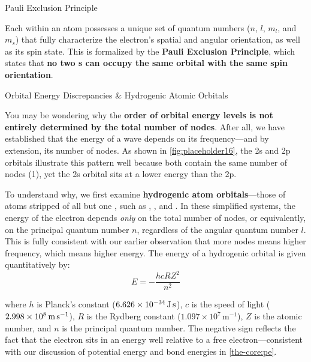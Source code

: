 \documentclass[10pt]{article}
\begin{document}
    \begin{core}{Pauli Exclusion Principle}
    
      Each  within an atom possesses a unique set of quantum numbers ($n$, $l$, $m_l$, and $m_s$) that fully characterize the electron's spatial and angular orientation, as well as its spin state. This is formalized by the \textbf{Pauli Exclusion Principle}, which states that \textbf{no two s can occupy the same orbital with the same spin orientation}.

    \end{core}

    \begin{core}[label=core:hydrogenic]{Orbital Energy Discrepancies \& Hydrogenic Atomic Orbitals}

      You may be wondering why the \textbf{order of orbital energy levels is not entirely determined by the total number of nodes}. After all, we have established that the energy of a wave depends on its frequency---and by extension, its number of nodes. As shown in \autoref{fig:placeholder16}, the 2s and 2p orbitals illustrate this pattern well because both contain the same number of nodes (1), yet the 2s orbital sits at a lower energy than the 2p.


      To understand why, we first examine \textbf{hydrogenic atom orbitals}---those of atoms stripped of all but one , such as , , and . In these simplified systems, the energy of the electron depends \textit{only} on the total number of nodes, or equivalently, on the principal quantum number $n$, regardless of the angular quantum number $l$. This is fully consistent with our earlier observation that more nodes means higher frequency, which means higher energy. The energy of a hydrogenic orbital is given quantitatively by:
      \[
        E = -\frac{hcRZ^2}{n^2}
      \]

      where $h$ is Planck's constant ($6.626 \times 10^{-34}\,\text{J\,s}$), $c$ is the speed of light ($2.998 \times 10^8\,\text{m\,s}^{-1}$), $R$ is the Rydberg constant ($1.097 \times 10^7\,\text{m}^{-1}$), $Z$ is the atomic number, and $n$ is the principal quantum number. The negative sign reflects the fact that the electron sits in an energy well relative to a free electron---consistent with our discussion of potential energy and bond energies in \autoref{the-core:pe}.


\end{core}
\end{document}
